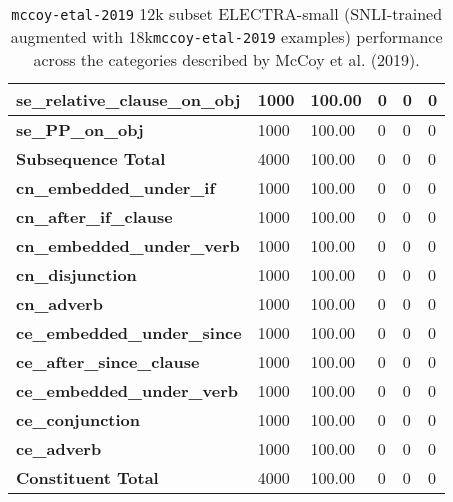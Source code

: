 \begin{table}[!ht]
\begin{tabular}{|p{}|p{}|p{}|p{}|p{}|p{}|}
        \textbf{se\_relative\_clause\_on\_obj} & 1000 & 100.00 & 0 & 0 & 0 \\ \hline
        \textbf{se\_PP\_on\_obj} & 1000 & 100.00 & 0 & 0 & 0 \\ \hline
        \textbf{Subsequence Total} & 4000 & 100.00 & 0 & 0 & 0 \\ \hline
        \textbf{cn\_embedded\_under\_if} & 1000 & 100.00 & 0 & 0 & 0 \\ \hline
        \textbf{cn\_after\_if\_clause} & 1000 & 100.00 & 0 & 0 & 0 \\ \hline
        \textbf{cn\_embedded\_under\_verb} & 1000 & 100.00 & 0 & 0 & 0 \\ \hline
        \textbf{cn\_disjunction} & 1000 & 100.00 & 0 & 0 & 0 \\ \hline
        \textbf{cn\_adverb} & 1000 & 100.00 & 0 & 0 & 0 \\ \hline
        \textbf{ce\_embedded\_under\_since} & 1000 & 100.00 & 0 & 0 & 0 \\ \hline
        \textbf{ce\_after\_since\_clause} & 1000 & 100.00 & 0 & 0 & 0 \\ \hline
        \textbf{ce\_embedded\_under\_verb} & 1000 & 100.00 & 0 & 0 & 0 \\ \hline
        \textbf{ce\_conjunction} & 1000 & 100.00 & 0 & 0 & 0 \\ \hline
        \textbf{ce\_adverb} & 1000 & 100.00 & 0 & 0 & 0 \\ \hline
        \textbf{Constituent Total} & 4000 & 100.00 & 0 & 0 & 0 \\ \hline
    \end{tabular}
    \caption{\texttt{mccoy-etal-2019} 12k subset ELECTRA-small (SNLI-trained augmented with 18k\texttt{mccoy-etal-2019} examples) performance across the categories described by McCoy et al. (2019).}
\end{table}
